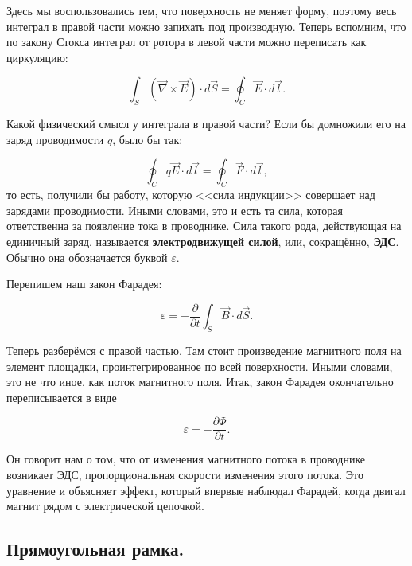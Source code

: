 \documentclass[a4paper,12pt]{article}
\numberwithin{equation}{section}
\newcommand{\pt}{\partial}
\newcommand{\vareps}{\varepsilon}
\newcommand{\vn}{\vec{\nabla}}
\begin{document}
Здесь мы воспользовались тем, что поверхность не меняет форму, поэтому
весь интеграл в правой части можно запихать под производную. Теперь
вспомним, что по закону Стокса интеграл от ротора в левой части можно
переписать как циркуляцию: 

\begin{equation}
  \label{eq:eds_2}
  \int_S \left( \vn \times \vec{E} \right) \cdot d\vec{S} = \oint_C
  \vec{E} \cdot d \vec{l}.
\end{equation}

Какой физический смысл у интеграла в правой части? Если бы домножили
его на заряд проводимости $q$, было бы так: 

\begin{equation}
  \label{eq:eds_3}
  \oint_C q \vec{E} \cdot d \vec{l} = \oint_C \vec{F} \cdot d \vec{l},
\end{equation}
то есть, получили бы работу, которую <<сила индукции>> совершает над
зарядами проводимости. Иными словами, это и есть та сила, которая
ответственна за появление тока в проводнике. Сила такого рода,
действующая на единичный заряд, называется \textbf{электродвижущей
  силой}, или, сокращённо, \textbf{ЭДС}. Обычно она обозначается
буквой $\vareps$. 

Перепишем наш закон Фарадея:

\begin{equation}
  \label{eq:eds_4}
  \vareps = - \frac{\pt}{\pt t} \int_S \vec{B} \cdot d\vec{S}.
\end{equation}

Теперь разберёмся с правой частью. Там стоит произведение магнитного
поля на элемент площадки, проинтегрированное по всей
поверхности. Иными словами, это не что иное, как поток магнитного
поля. Итак, закон Фарадея окончательно переписывается в виде

\begin{equation}
  \label{eq:eds_5}
  \vareps = - \frac{\pt \Phi}{\pt t}.
\end{equation}

Он говорит нам о том, что от изменения магнитного потока в проводнике
возникает ЭДС, пропорциональная скорости изменения этого потока. Это
уравнение и объясняет эффект, который впервые наблюдал Фарадей, когда
двигал магнит рядом с электрической цепочкой. 

\subsection{Прямоугольная рамка.}
\label{sec:rectangle}
\end{document}

